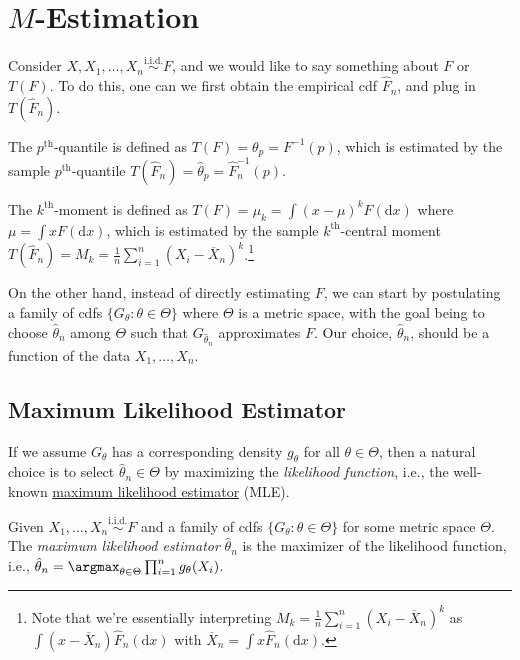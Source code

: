 \chapter{\(M\)-Estimation}
Consider \(X, X_1, \dots , X_n \overset{\text{i.i.d.} }{\sim } F\), and we would like to say something about \(F\) or \(T(F)\). To do this, one can we first obtain the empirical cdf \(\hat{F} _n\), and plug in \(T(\hat{F} _n)\).

\begin{eg}[Quantile]
	The \(p^{\text{th} }\)-quantile is defined as \(T(F) = \theta _p = F^{-1} (p)\), which is estimated by the sample \(p^{\text{th} }\)-quantile \(T(\hat{F} _n) = \hat{\theta} _p = \hat{F} _n ^{-1} (p)\).
\end{eg}

\begin{eg}[Moment]
	The \(k^{\text{th} }\)-moment is defined as \(T(F) = \mu _k = \int (x - \mu )^k F(\mathrm{d} x)\) where \(\mu = \int x F(\mathrm{d} x)\), which is estimated by the sample \(k^{\text{th} }\)-central moment \(T(\hat{F} _n) = M_k = \frac{1}{n} \sum_{i=1}^{n} (X_i - \overline{X} _n)^k\).\footnote{Note that we're essentially interpreting \(M_k = \frac{1}{n}\sum_{i=1}^{n} (X_i - \overline{X} _n)^k\) as \(\int (x - \overline{X} _n) \hat{F} _n(\mathrm{d} x)\) with \(\overline{X} _n = \int x \hat{F} _n(\mathrm{d} x)\).}
\end{eg}

On the other hand, instead of directly estimating \(F\), we can start by postulating a family of cdfs \(\{ G_\theta \colon \theta  \in \Theta \} \) where \(\Theta \) is a metric space, with the goal being to choose \(\hat{\theta} _n\) among \(\Theta \) such that \(G_{\hat{\theta} _n}\) approximates \(F\). Our choice, \(\hat{\theta} _n\), should be a function of the data \(X_1, \dots , X_n\).

\section{Maximum Likelihood Estimator}
If we assume \(G_\theta \) has a corresponding density \(g_\theta \) for all \(\theta \in \Theta \), then a natural choice is to select \(\hat{\theta} _n \in \Theta \) by maximizing the \emph{likelihood function}, i.e., the well-known \hyperref[def:MLE]{maximum likelihood estimator} (MLE).

\begin{definition}\label{def:MLE}
	Given \(X_1, \dots , X_n \overset{\text{i.i.d.} }{\sim } F\) and a family of cdfs \(\{ G_\theta \colon \theta \in \Theta \} \) for some metric space \(\Theta \). The \emph{maximum likelihood estimator} \(\hat{\theta} _n\) is the maximizer of the likelihood function, i.e., \(\hat{\theta} _n = \argmax_{\theta \in \Theta } \prod_{i=1}^{n} g_\theta (X_i)\).
\end{definition}

